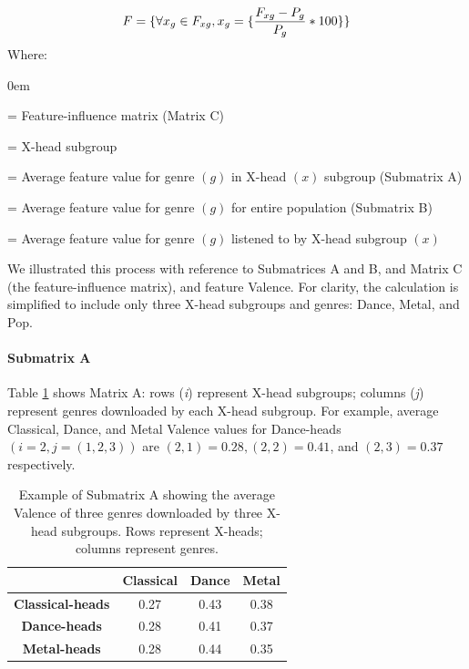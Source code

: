 \documentclass[a4paper]{article}
\begin{document}
\begin{equation}
F = \{ \forall x_g \in F_{xg}, x_g = \{\frac{F_{xg} - P_g}{P_g} * 100 \} \} \\
\label{eqn:user}
\end{equation}
Where:
\begin{description}
\itemsep0em 
\item[$F$] = Feature-influence matrix (Matrix C)
\item[$x$] = X-head subgroup
\item[$F_{xg}$] = Average feature value for genre $(g)$ in X-head $(x)$ subgroup (Submatrix A)
\item[$P_g$] = Average feature value for genre  $(g)$ for entire population (Submatrix B)
\item[$x_g$] = Average feature value for genre $(g)$ listened to by X-head subgroup $(x)$
\end{description}

We illustrated this process with reference to Submatrices A and B, and Matrix C (the feature-influence matrix), and feature Valence. For clarity, the calculation is simplified to include only three X-head subgroups and genres: Dance, Metal, and Pop.
 
\paragraph{Submatrix A}
Table \ref{tab:matA} shows Matrix A: rows (\textit{i}) represent X-head subgroups; columns (\textit{j}) represent genres downloaded by each X-head subgroup. For example, average Classical, Dance, and Metal Valence values for Dance-heads $(i=2, j=(1,2,3))$ are $(2,1) = 0.28, (2,2) = 0.41$, and $(2,3) = 0.37$ respectively.

\begin{table}[ht]
\centering
\begin{tabular}{|c|c|c|c|}
  \hline
\textbf{} & \textbf{Classical} & \textbf{Dance} & \textbf{Metal} \\
  \hline
\textbf{Classical-heads} & 0.27 & 0.43 & 0.38 \\
 \hline
\textbf{Dance-heads} & 0.28 & 0.41 & 0.37 \\
 \hline
\textbf{Metal-heads} & 0.28 & 0.44 & 0.35 \\
\hline
\end{tabular}
\caption[Submatrix A Example]{Example of Submatrix A showing the average Valence of three genres downloaded by three X-head subgroups. Rows represent X-heads; columns represent  genres. \label{tab:matA}}
\end{table}
\end{document}
